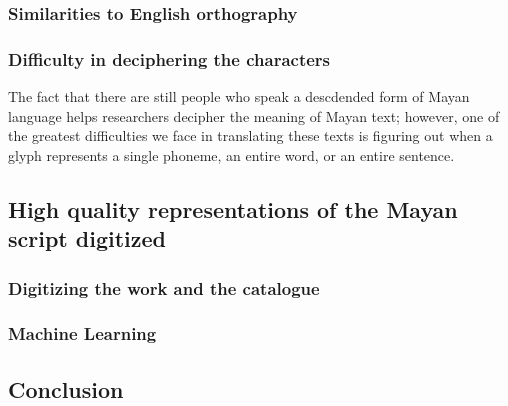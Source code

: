 \documentclass[11pt]{article}
\begin{document}
\subsubsection{Similarities to English orthography}
\label{sec:orgheadline2}

\subsubsection{Difficulty in deciphering the characters}
\label{sec:orgheadline3}
The fact  that there are still  people who speak a  descdended form of
Mayan language helps  researchers decipher the meaning  of Mayan text;
however, one of the greatest difficulties we face in translating these
texts is  figuring out when  a glyph  represents a single  phoneme, an
entire word, or an entire sentence.

\subsection{High quality representations of the Mayan script digitized}
\label{sec:orgheadline7}

\subsubsection{Digitizing the work and the catalogue}
\label{sec:orgheadline5}

\subsubsection{Machine Learning}
\label{sec:orgheadline6}

\subsection{Conclusion}
\label{sec:orgheadline8}




\end{document}
